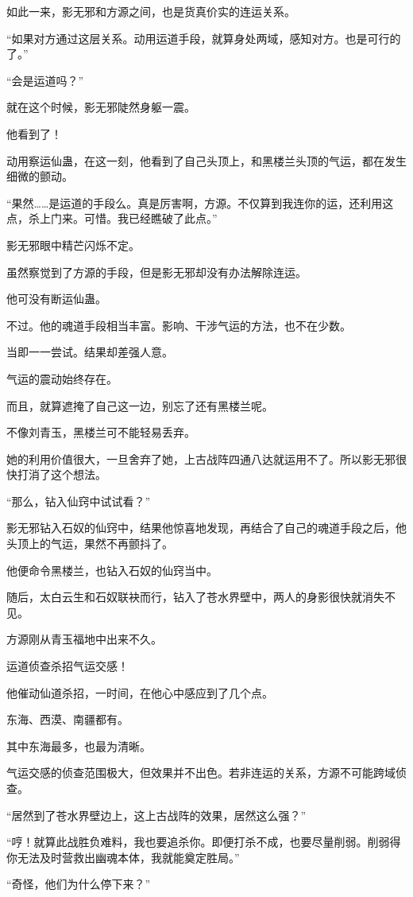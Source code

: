 \begin{this_body}
如此一来，影无邪和方源之间，也是货真价实的连运关系。

“如果对方通过这层关系。动用运道手段，就算身处两域，感知对方。也是可行的了。”

“会是运道吗？”

就在这个时候，影无邪陡然身躯一震。

他看到了！

动用察运仙蛊，在这一刻，他看到了自己头顶上，和黑楼兰头顶的气运，都在发生细微的颤动。

“果然……是运道的手段么。真是厉害啊，方源。不仅算到我连你的运，还利用这点，杀上门来。可惜。我已经瞧破了此点。”

影无邪眼中精芒闪烁不定。

虽然察觉到了方源的手段，但是影无邪却没有办法解除连运。

他可没有断运仙蛊。

不过。他的魂道手段相当丰富。影响、干涉气运的方法，也不在少数。

当即一一尝试。结果却差强人意。

气运的震动始终存在。

而且，就算遮掩了自己这一边，别忘了还有黑楼兰呢。

不像刘青玉，黑楼兰可不能轻易丢弃。

她的利用价值很大，一旦舍弃了她，上古战阵四通八达就运用不了。所以影无邪很快打消了这个想法。

“那么，钻入仙窍中试试看？”

影无邪钻入石奴的仙窍中，结果他惊喜地发现，再结合了自己的魂道手段之后，他头顶上的气运，果然不再颤抖了。

他便命令黑楼兰，也钻入石奴的仙窍当中。

随后，太白云生和石奴联袂而行，钻入了苍水界壁中，两人的身影很快就消失不见。

方源刚从青玉福地中出来不久。

运道侦查杀招气运交感！

他催动仙道杀招，一时间，在他心中感应到了几个点。

东海、西漠、南疆都有。

其中东海最多，也最为清晰。

气运交感的侦查范围极大，但效果并不出色。若非连运的关系，方源不可能跨域侦查。

“居然到了苍水界壁边上，这上古战阵的效果，居然这么强？”

“哼！就算此战胜负难料，我也要追杀你。即便打杀不成，也要尽量削弱。削弱得你无法及时营救出幽魂本体，我就能奠定胜局。”

“奇怪，他们为什么停下来？”


\end{this_body}
